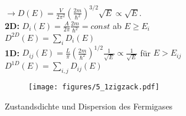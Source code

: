 \begin{itemize}
        $\rightarrow D(E) = \frac{V}{2\pi^2}\left(\frac{2m}{\hbar^2}\right)^{3/2}\sqrt{E} \propto \sqrt{E}$. \\
        \textbf{2D:} $D_i(E) = \frac{A}{2\pi}\frac{2m}{\hbar^2} = const $ ab $E \ge E_i$ \\
        $D^{2D}(E) = \sum_i D_i(E)$ \\
        \textbf{1D:} $D_{ij}(E) = \frac{L}{\pi}\left(\frac{2m}{\hbar^2}\right)^{1/2}\frac{1}{\sqrt{E}} \propto \frac{1}{\sqrt{E}} $ für $ E > E_{ij}$ \\
        $D^{1D}(E) = \sum_{i,j} D_{ij}(E)$
        \begin{figure}[H]
            \centering
            \texttt{[image: figures/5\_1zigzack.pdf]}
            \caption{}
            \label{}
        \end{figure}
        
        Zustandsdichte und Dispersion des Fermigases


\end{itemize}
